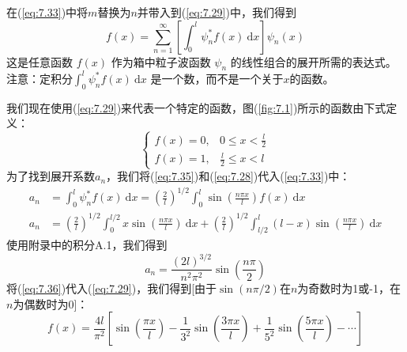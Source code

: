     在(\ref{eq:7.33})中将$m$替换为$n$并带入到(\ref{eq:7.29})中，我们得到
    \begin{equation}
        f\left(x\right) = \sum_{n=1}^{\infty} \left[\int_{0}^{l} \psi_n^{\ast} f\left(x\right) \: \mathrm{d}x\right] \psi_n\left(x\right)
        \label{eq:7.34}
    \end{equation}
    这是任意函数 $f\left(x\right)$ 作为箱中粒子波函数 $\psi_n$ 的线性组合的展开所需的表达式。注意：定积分$\int_{0}^{l} \psi_n^{\ast} f\left(x\right) \: \mathrm{d}x$ 是一个数，而不是一个关于$x$的函数。

    我们现在使用(\ref{eq:7.29})来代表一个特定的函数，图(\ref{fig:7.1})所示的函数由下式定义：
    \begin{equation}
        \begin{cases}
            f\left(x\right) = 0, & 0 \leq x < \frac{l}{2} \\
            f\left(x\right) = 1, & \frac{l}{2} \leq x < l
        \end{cases}
        \label{eq:7.35}
    \end{equation}
    为了找到展开系数$a_n$，我们将(\ref{eq:7.35})和(\ref{eq:7.28})代入(\ref{eq:7.33})中：
    \begin{equation*}
        \begin{aligned}
            a_n &= \int_{0}^{l} \psi_n^{\ast} f\left(x\right) \: \mathrm{d}x = \left(\frac{2}{l}\right)^{1/2} \int_{0}^{l} \sin\left(\frac{n\pi x}{l}\right) f\left(x\right) \: \mathrm{d}x \\
            a_n &= \left(\frac{2}{l}\right)^{1/2} \int_{0}^{l/2} x\sin\left(\frac{n\pi x}{l}\right) \: \mathrm{d}x + \left(\frac{2}{l}\right)^{1/2} \int_{l/2}^{l} \left(l-x\right)\sin\left(\frac{n\pi x}{l}\right) \: \mathrm{d}x
        \end{aligned}
    \end{equation*}
    使用附录中的积分A.1，我们得到
    \begin{equation}
        a_n = \frac{\left(2l\right)^{3/2}}{n^2\pi^2}\sin\left(\frac{n\pi}{2}\right)
        \label{eq:7.36}
    \end{equation}
    将(\ref{eq:7.36})代入(\ref{eq:7.29})，我们得到[由于$\sin\left(n\pi/2\right)$在$n$为奇数时为1或-1，在$n$为偶数时为0]：
    \begin{equation*}
        f\left(x\right) = \frac{4l}{\pi^2}\left[\sin\left(\frac{\pi x}{l}\right) - \frac{1}{3^2}\sin\left(\frac{3\pi x}{l}\right) + \frac{1}{5^2}\sin\left(\frac{5\pi x}{l}\right) - \cdots\right]
    \end{equation*}

